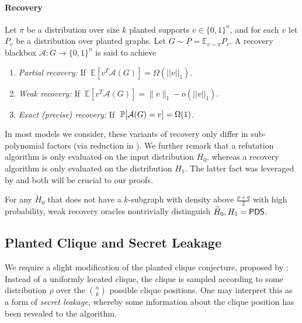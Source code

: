 \documentclass[final,12pt]{colt2023} %
\newcommand\1[1]{\mathbb{I}_{\left\{#1\right\}}}
\begin{document}
\paragraph{Recovery} Let $\pi$ be a distribution over size $k$ planted supports $v\in\{0,1\}^n$, and for each $v$ let $P_v$ be a distribution over planted graphs. 
Let $G\sim P = \mathbb{E}_{v\sim \pi}P_v$. A recovery blackbox $\mathcal{A}: G\to \{0,1\}^n$ 
is said to achieve 
\begin{enumerate}
\item  \textit{Partial recovery:}\;\;\;\; If $\;\mathbb{E}[ v^T\mathcal{A}(G)]=\Omega(||v||_1)$.
    \item \textit{Weak recovery:}\;\;\;\; If $\;\mathbb{E}[ v^T\mathcal{A}(G)]=\|v\|_1-o(||v||_1)$.
    \item \textit{Exact (precise) recovery:}\;\;\;\; If $\;\P[ \mathcal{A}(G)=v]= \Omega(1)$.
\end{enumerate}
In most models we consider, these variants of recovery only differ in sub-polynomial factors (via reduction in ). 
We further remark that a refutation algorithm is only evaluated on the input distribution $H_0$, whereas a recovery algorithm is only evaluated on the distribution $H_1$. The latter fact was leveraged by \cite{SchrammWein} and both will be crucial to our proofs.
\begin{lemma} \label{lem: oracle to detection}
For any $\tilde H_0$ that does not have a $k$-subgraph with density above $\frac{p+q}{2}$ with high probability, weak recovery oracles nontrivially distinguish $\tilde H_0, H_1=\pd$.
\end{lemma}




\subsection{Planted Clique and Secret Leakage}
We require a slight modification of the planted clique conjecture, proposed by \cite{BB20}:
Instead of a uniformly located clique, the clique is sampled according to some distribution $\rho$ over the $n\choose k$ possible clique positions. One may interpret this as a form of \emph{secret leakage}, whereby some information about the clique position has been revealed to the algorithm.
\end{document}
